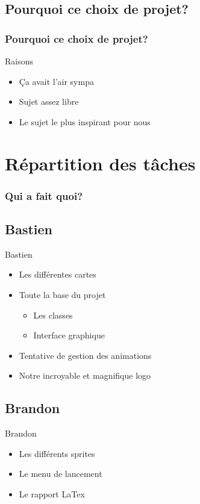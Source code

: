 \documentclass{beamer}
\begin{document}
\subsection{Pourquoi ce choix de projet?}
\begin{frame} \frametitle{Pourquoi ce choix de projet?}
	\begin{block}{Raisons}
		\begin{itemize}
			\item Ça avait l'air sympa
			\item Sujet assez libre
			\item Le sujet le plus inspirant pour nous
		\end{itemize}
	\end{block}
\end{frame}

\section{Répartition des tâches}

\begin{frame} \frametitle{Qui a fait quoi?}
	\subsection{Bastien}
	\begin{block}{Bastien}
		\begin{itemize}
			\item Les différentes cartes
			\item Toute la base du projet
				\begin{itemize}
					\item Les classes
					\item Interface graphique
				\end{itemize}
			\item Tentative de gestion des animations
			\item Notre incroyable et magnifique logo
		\end{itemize}
	\end{block}
	\subsection{Brandon}
	\begin{block}{Brandon}
		\begin{itemize}
			\item Les différents sprites
			\item Le menu de lancement
			\item Le rapport LaTex
		\end{itemize}
	\end{block}
\end{frame}
\end{document}
